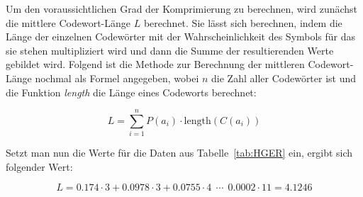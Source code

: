 \documentclass[twoside,11pt,a4paper]{article}
\theoremstyle{break}
\begin{document}
Um den voraussichtlichen Grad der Komprimierung zu berechnen, wird
zunächst die mittlere Codewort-Länge $L$ berechnet. Sie lässt sich
berechnen, indem die Länge der einzelnen Codewörter mit der
Wahrscheinlichkeit des Symbols für das sie stehen multipliziert wird
und dann die Summe der resultierenden Werte gebildet wird. Folgend ist die
Methode zur Berechnung der mittleren Codewort-Länge nochmal als Formel
angegeben, wobei $n$ die Zahl aller Codewörter ist und die
Funktion \emph{length} die Länge eines Codeworts berechnet:

\begin{equation}
L = \sum_{i=1}^{n} P(a_i) \cdot \mathrm{length}(C(a_i))
\end{equation}

Setzt man nun die Werte für die Daten aus Tabelle~\ref{tab:HGER} ein,
ergibt sich folgender Wert:

\begin{equation}
L = 0.174 \cdot 3 + 0.0978 \cdot 3 + 0.0755 \cdot 4\ \ \cdots\ \ 0.0002 \cdot 11 = 4.1246
\end{equation}
\end{document}
